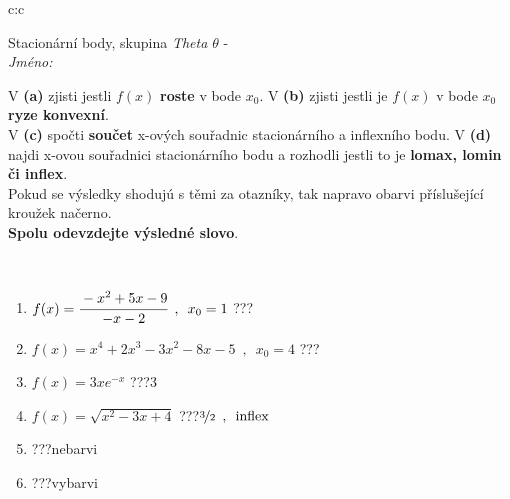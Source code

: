 \documentclass[10pt]{report}
\begin{document}
\newpage
\thispagestyle{empty}
\begin{tabular}{c:c}
\begin{minipage}[c][104.5mm][t]{0.5\linewidth}
\begin{center}
\vspace{7mm}
{\huge Stacionární body, skupina \textit{Theta $\theta$} -}\\[5mm]
\textit{Jméno:}\phantom{xxxxxxxxxxxxxxxxxxxxxxxxxxxxxxxxxxxxxxxxxxxxxxxxxxxxxxxxxxxxxxxxx}\\[5mm]
\begin{minipage}{0.95\linewidth}
\begin{center}
{\small V \textbf{(a)} zjisti jestli $f(x)$ \textbf{roste} v bode $x_0$. V \textbf{(b)} zjisti jestli je $f(x)$ v bode $x_0$ \textbf{ryze konvexní}.\\V \textbf{(c)} spočti \textbf{součet} x-ových souřadnic stacionárního a inflexního bodu. V \textbf{(d)} najdi x-ovou souřadnici stacionárního bodu a rozhodli jestli to je \textbf{lomax, lomin či inflex}.\\Pokud se výsledky shodujú s těmi za otazníky, tak napravo obarvi příslušející kroužek načerno.\\\textbf{Spolu odevzdejte výsledné slovo}}.
\end{center}
\end{minipage}
\\[1mm]
\begin{minipage}{0.79\linewidth}
\begin{center}
\begin{varwidth}{\linewidth}
\begin{enumerate}
\normalsize
\item $f(x)=\cfrac{-x^2+5x-9}{-x-2}\enspace , \enspace x_0=1$\quad \dotfill\; ???\;\dotfill \quad {}
\item $f(x)=x^4+2x^3-3x^2-8x-5\enspace , \enspace x_0=4$\quad \dotfill\; ???\;\dotfill \quad {}
\item $f(x)=3xe^{-x}$\quad \dotfill\; ???\;\dotfill \quad $3$
\item $f(x)=\sqrt{x^2-3x+4}$\quad \dotfill\; ???\;\dotfill \quad $\nicefrac{3}{2}\enspace , \enspace\mathrm{inflex}$
\item \quad \dotfill\; ???\;\dotfill \quad nebarvi
\item \quad \dotfill\; ???\;\dotfill \quad vybarvi
\end{enumerate}
\end{varwidth}
\end{center}

\end{minipage}
\end{center}
\end{minipage}
\end{tabular}
\end{document}
